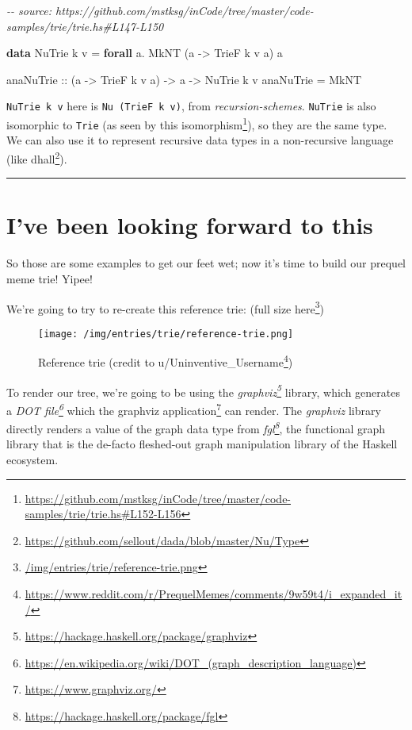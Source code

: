 \documentclass[]{article}
\newenvironment{Shaded}{}{}
\newcommand{\CommentTok}[1]{\textcolor[rgb]{0.38,0.63,0.69}{\textit{#1}}}
\newcommand{\DataTypeTok}[1]{\textcolor[rgb]{0.56,0.13,0.00}{#1}}
\newcommand{\KeywordTok}[1]{\textcolor[rgb]{0.00,0.44,0.13}{\textbf{#1}}}
\newcommand{\NormalTok}[1]{#1}
\newcommand{\OperatorTok}[1]{\textcolor[rgb]{0.40,0.40,0.40}{#1}}
\newcommand{\OtherTok}[1]{\textcolor[rgb]{0.00,0.44,0.13}{#1}}
\renewcommand{\href}[2]{#2\footnote{\url{#1}}}
\begin{document}
\begin{Shaded}
\begin{Highlighting}[]
\CommentTok{{-}{-} source: https://github.com/mstksg/inCode/tree/master/code{-}samples/trie/trie.hs\#L147{-}L150}

\KeywordTok{data} \DataTypeTok{NuTrie}\NormalTok{ k v }\OtherTok{=} \KeywordTok{forall}\NormalTok{ a}\OperatorTok{.} \DataTypeTok{MkNT}\NormalTok{ (a }\OtherTok{{-}\textgreater{}} \DataTypeTok{TrieF}\NormalTok{ k v a) a}

\OtherTok{anaNuTrie ::}\NormalTok{ (a }\OtherTok{{-}\textgreater{}} \DataTypeTok{TrieF}\NormalTok{ k v a) }\OtherTok{{-}\textgreater{}}\NormalTok{ a }\OtherTok{{-}\textgreater{}} \DataTypeTok{NuTrie}\NormalTok{ k v }
\NormalTok{anaNuTrie }\OtherTok{=} \DataTypeTok{MkNT}
\end{Highlighting}
\end{Shaded}

\texttt{NuTrie\ k\ v} here is \texttt{Nu\ (TrieF\ k\ v)}, from
\emph{recursion-schemes}. \texttt{NuTrie} is also isomorphic to \texttt{Trie}
(as seen by
\href{https://github.com/mstksg/inCode/tree/master/code-samples/trie/trie.hs\#L152-L156}{this
isomorphism}), so they are the same type. We can also use it to represent
recursive data types in a non-recursive language (like
\href{https://github.com/sellout/dada/blob/master/Nu/Type}{dhall}).

\begin{center}\rule{0.5\linewidth}{0.5pt}\end{center}

\section{I've been looking forward to
this}\label{ive-been-looking-forward-to-this}

So those are some examples to get our feet wet; now it's time to build our
prequel meme trie! Yipee!

We're going to try to re-create this reference trie:
(\href{/img/entries/trie/reference-trie.png}{full size here})

\begin{figure}
\centering
\texttt{[image: /img/entries/trie/reference-trie.png]}
\caption{Reference trie (credit to
\href{https://www.reddit.com/r/PrequelMemes/comments/9w59t4/i_expanded_it/}{u/Uninventive\_Username})}
\end{figure}

To render our tree, we're going to be using the
\emph{\href{https://hackage.haskell.org/package/graphviz}{graphviz}} library,
which generates a
\emph{\href{https://en.wikipedia.org/wiki/DOT_(graph_description_language)}{DOT
file}} which the \href{https://www.graphviz.org/}{graphviz application} can
render. The \emph{graphviz} library directly renders a value of the graph data
type from \emph{\href{https://hackage.haskell.org/package/fgl}{fgl}}, the
functional graph library that is the de-facto fleshed-out graph manipulation
library of the Haskell ecosystem.
\end{document}
